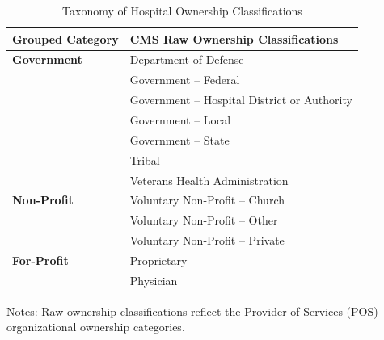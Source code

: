 \documentclass{article}
\begin{document}
\begin{table}[htbp]
\centering
\caption{Taxonomy of Hospital Ownership Classifications}
\label{tab:ownership_mapping}

\renewcommand{\arraystretch}{1.15}

\begin{threeparttable}

\begin{tabular}{p{2.0in} p{4.2in}}
\toprule
\textbf{Grouped Category} &
\textbf{CMS Raw Ownership Classifications} \\
\midrule

\textbf{Government}
& Department of Defense \\
& Government -- Federal \\
& Government -- Hospital District or Authority \\
& Government -- Local \\
& Government -- State \\
& Tribal \\
& Veterans Health Administration \\
\midrule

\textbf{Non-Profit}
& Voluntary Non-Profit -- Church \\
& Voluntary Non-Profit -- Other \\
& Voluntary Non-Profit -- Private \\
\midrule

\textbf{For-Profit}
& Proprietary \\
& Physician \\
\bottomrule

\end{tabular}

\begin{tablenotes}[flushleft]
\footnotesize
\item Notes:
Raw ownership classifications reflect the Provider of Services
(POS) organizational ownership categories.
\end{tablenotes}

\end{threeparttable}
\end{table}
\end{document}
